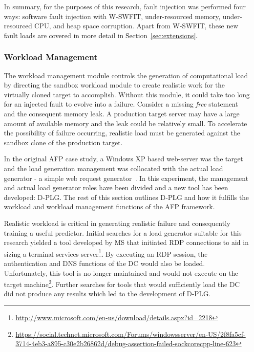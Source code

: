 \tabFaults %

\tabTranslationThirtyTwo
\tabTranslationSixtyFour

In summary, for the purposes of this research, fault injection was performed
four ways: software fault injection with \ac{W-SWFIT}, under-resourced memory,
under-resourced CPU, and heap space corruption.  Apart from \ac{W-SWFIT}, these
new fault loads are covered in more detail in Section~\ref{sec:extensions}.

\subsubsection{Workload Management} \label{sec:workloadMgr} 
The workload management module controls the generation of computational load by
directing the sandbox workload module to create realistic work for the
virtually cloned target to accomplish.  Without this module, it could take too
long for an injected fault to evolve into a failure.  Consider a missing
\emph{free} statement and the consequent memory leak.  A production target
server may have a large amount of available memory and the leak could be
relatively small.  To accelerate the possibility of failure occurring,
realistic load must be generated against the sandbox clone of the production
target.

In the original \ac{AFP} case study, a Windows XP based web-server was the
target and the load generation management was collocated with the actual load
generator - a simple web request generator~\cite{irrera2015}.  In this
experiment, the management and actual load generator roles have been divided
and a new tool has been developed: \ac{D-PLG}.  The rest of this section
outlines \ac{D-PLG} and how it fulfills the workload and workload management
functions of the \ac{AFP} framework.

Realistic workload is critical in generating realistic failure and consequently
training a useful predictor.  Initial searches for a load generator suitable
for this research yielded a tool developed by \ac{MS} that initiated \ac{RDP}
connections to aid in sizing a terminal services
server\footnote{\url{http://www.microsoft.com/en-us/download/details.aspx?id=2218}}.
By executing an \ac{RDP} session, the authentication and \ac{DNS} functions of
the \ac{DC} would also be loaded.  Unfortunately, this tool is no longer
maintained and would not execute on the target
machine\footnote{\url{https://social.technet.microsoft.com/Forums/windowsserver/en-US/2f8fa5cf-3714-4eb3-a895-c30e2b26862d/debug-assertion-failed-sockcorecpp-line-623}}.
Further searches for tools that would sufficiently load the \ac{DC} did not
produce any results which led to the development of \ac{D-PLG}.

